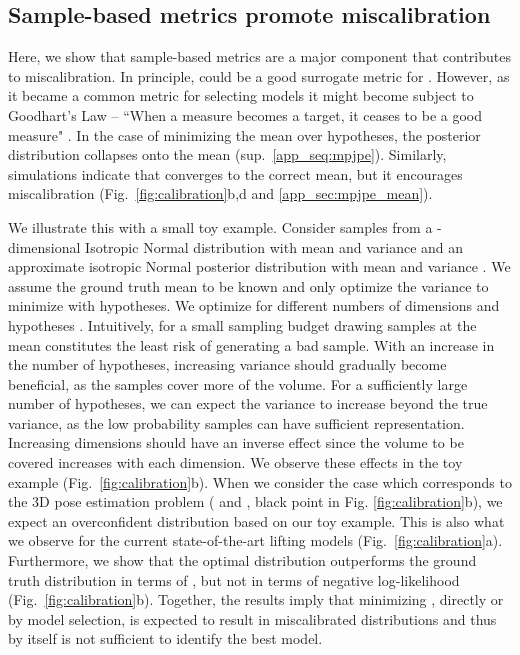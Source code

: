 \documentclass{article} \usepackage{iclr2023_conference,times}
\begin{document}
    \subsection{Sample-based metrics promote miscalibration}
    \label{sec:simple_toy}
    Here, we show that sample-based metrics are a major component that contributes to miscalibration.
    In principle,  could be a good surrogate metric for .
    However, as it became a common metric for selecting models it might become subject to Goodhart's Law \citep{Goodhart1975}  --  ``When a measure becomes a target, it ceases to be a good measure" \citep{Strathern1997-nr}.
    In the case of minimizing the mean  over hypotheses, the posterior distribution collapses onto the mean (sup.~\ref{app_seq:mpjpe}). Similarly, simulations indicate that  converges to the correct mean, but it encourages miscalibration (Fig.~\ref{fig:calibration}b,d and \ref{app_sec:mpjpe_mean}).
    
    We illustrate this with a small toy example.
    Consider  samples  from a -dimensional Isotropic Normal distribution with mean  and variance  and an approximate isotropic Normal posterior distribution  with mean  and variance .
    We assume the ground truth mean to be known  and only optimize the variance  to minimize  with  hypotheses.
    We optimize  for different numbers of dimensions  and hypotheses .
    Intuitively, for a small sampling budget drawing samples at the mean constitutes the least risk of generating a bad sample.
    With an increase in the number of hypotheses, increasing variance should gradually become beneficial, as the samples cover more of the volume.
    For a sufficiently large number of hypotheses, we can expect the variance to increase beyond the true variance, as the low probability samples can have sufficient representation.
    Increasing dimensions should have an inverse effect since the volume to be covered increases with each dimension.
    We observe these effects in the toy example (Fig.~\ref{fig:calibration}b).
    When we consider the case which corresponds to the 3D pose estimation problem ( and , black point in Fig. \ref{fig:calibration}b), we expect an overconfident distribution based on our toy example.
    This is also what we observe for the current state-of-the-art lifting models (Fig.~\ref{fig:calibration}a).
    Furthermore, we show that the  optimal distribution outperforms the ground truth distribution in terms of , but not in terms of negative log-likelihood (Fig.~\ref{fig:calibration}b).
    Together, the results imply that minimizing , directly or by model selection, is expected to result in miscalibrated distributions and thus  by itself is not sufficient to identify the best model.
    
\end{document}
